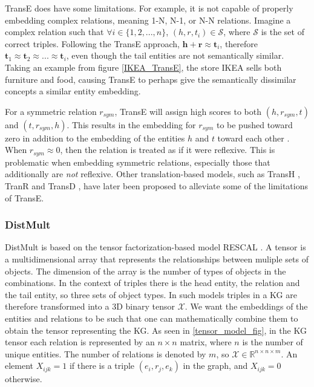TransE does have some limitations. For example, it is not capable of properly embedding complex relations, meaning 1-N, N-1, or N-N relations. Imagine a complex relation such that $\forall i \in \{1,2, ..., n\}$, $(h, r, t_i )\in \mathcal{S}$, where $\mathcal{S}$ is the set of correct triples. Following the TransE approach, $\textbf{h}+\textbf{r}\approx \textbf{t}_i$, therefore $\textbf{t}_1 \approx \textbf{t}_2 \approx ... \approx \textbf{t}_i$, even though the tail entities are not semantically similar. Taking an example from figure \ref{IKEA_TransE}, the store IKEA sells both furniture and food, causing TransE to perhaps give the semantically dissimilar concepts a similar entity embedding. 

For a symmetric relation $r_{sym}$, TransE will assign high scores to both $(h, r_{sym}, t)$ and $(t, r_{sym}, h)$. This results in the embedding for $r_{sym}$ to be pushed toward zero in addition to the embedding of the entities $h$ and $t$ toward each other \cite{wang2018evaluating}. When $r_{sym} \approx 0$, then the relation is treated as if it were reflexive. This is problematic when embedding symmetric relations, especially those that additionally are \textit{not} reflexive. Other translation-based models, such as TransH \cite{transH}, TranR \cite{transR} and TransD \cite{transD}, have later been proposed to alleviate some of the limitations of TransE.

\subsubsection{DistMult}
DistMult is based on the tensor factorization-based model RESCAL \cite{RESCAL}. A tensor is a multidimensional array that represents the relationships between muliple sets of objects. The dimension of the array is the number of types of objects in the combinations. In the context of triples there is the head entity, the relation and the tail entity, so three sets of object types. In such models triples in a KG are therefore transformed into a 3D binary tensor $\mathcal{X}$. We want the embeddings of the entities and relations to be such that one can mathematically combine them to obtain the tensor representing the KG. As seen in \cref{tensor_model_fig}, in the KG tensor each relation is represented by an $n \times n$ matrix, where $n$ is the number of unique entities. The number of relations is denoted by $m$, so $\mathcal{X}\in \mathbb{R}^{n \times n \times m}$. An element $X_{ijk} = 1$ if there is a triple $(e_i, r_j, e_k)$ in the graph, and $X_{ijk} = 0$ otherwise.

